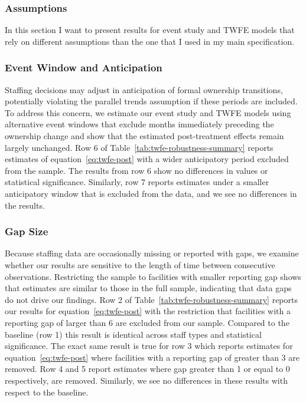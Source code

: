 \documentclass[preprint,authoryear]{elsarticle}
\begin{document}
\subsubsection{Assumptions}

In this section I want to present results for event study and TWFE models that rely on different assumptions than the one that I used in my main specification.


\subsubsection{Event Window and Anticipation}

Staffing decisions may adjust in anticipation of formal ownership transitions, potentially violating the parallel trends assumption if these periods are included. To address this concern, we estimate our event study and TWFE models using alternative event windows that exclude months immediately preceding the ownership change and show that the estimated post-treatment effects remain largely unchanged. Row 6 of Table~\ref{tab:twfe-robustness-summary} reports estimates of equation~\ref{eq:twfe-post} with a wider anticipatory period excluded from the sample. The results from row 6 show no differences in values or statistical significance. Similarly, row 7 reports estimates under a smaller anticipatory window that is excluded from the data, and we see no differences in the results.

\subsubsection{Gap Size}

Because staffing data are occasionally missing or reported with gaps, we examine whether our results are sensitive to the length of time between consecutive observations. Restricting the sample to facilities with smaller reporting gap shows that estimates are similar to those in the full sample, indicating that data gaps do not drive our findings. Row 2 of Table~\ref{tab:twfe-robustness-summary} reports our results for equation~\ref{eq:twfe-post} with the restriction that facilities with a reporting gap of larger than 6 are excluded from our sample. Compared to the baseline (row 1) this result is identical across staff types and statistical significance. The exact same result is true for row 3 which reports estimates for equation~\ref{eq:twfe-post} where facilities with a reporting gap of greater than 3 are removed. Row 4 and 5 report estimates where gap greater than 1 or equal to 0 respectively, are removed. Similarly, we see no differences in these results with respect to the baseline.
\end{document}
